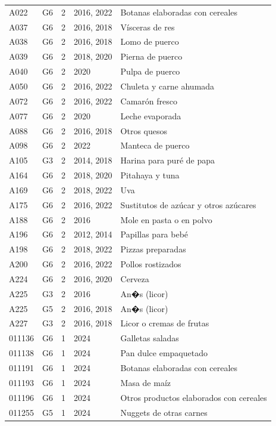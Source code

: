 \begin{table}[ht]
\begin{tabular}{llrll}
  A022 & G6 &   2 & 2016, 2022 & Botanas elaboradas con cereales \\ 
  A037 & G6 &   2 & 2016, 2018 & Vísceras de res \\ 
  A038 & G6 &   2 & 2016, 2018 & Lomo de puerco \\ 
  A039 & G6 &   2 & 2018, 2020 & Pierna de puerco \\ 
  A040 & G6 &   2 & 2020 & Pulpa de puerco \\ 
  A050 & G6 &   2 & 2016, 2022 & Chuleta y carne ahumada \\ 
  A072 & G6 &   2 & 2016, 2022 & Camarón fresco \\ 
  A077 & G6 &   2 & 2020 & Leche evaporada \\ 
  A088 & G6 &   2 & 2016, 2018 & Otros quesos \\ 
  A098 & G6 &   2 & 2022 & Manteca de puerco \\ 
  A105 & G3 &   2 & 2014, 2018 & Harina para puré de papa \\ 
  A164 & G6 &   2 & 2018, 2020 & Pitahaya y tuna \\ 
  A169 & G6 &   2 & 2018, 2022 & Uva \\ 
  A175 & G6 &   2 & 2016, 2022 & Sustitutos de azúcar y otros azúcares \\ 
  A188 & G6 &   2 & 2016 & Mole en pasta o en polvo \\ 
  A196 & G6 &   2 & 2012, 2014 & Papillas para bebé \\ 
  A198 & G6 &   2 & 2018, 2022 & Pizzas preparadas \\ 
  A200 & G6 &   2 & 2016, 2022 & Pollos rostizados \\ 
  A224 & G6 &   2 & 2016, 2020 & Cerveza \\ 
  A225 & G3 &   2 & 2016 & An�s (licor) \\ 
  A225 & G5 &   2 & 2016, 2018 & An�s (licor) \\ 
  A227 & G3 &   2 & 2016, 2018 & Licor o cremas de frutas \\ 
  011136 & G6 &   1 & 2024 & Galletas saladas \\ 
  011138 & G6 &   1 & 2024 & Pan dulce empaquetado \\ 
  011191 & G6 &   1 & 2024 & Botanas elaboradas con cereales \\ 
  011193 & G6 &   1 & 2024 & Masa de maíz \\ 
  011196 & G6 &   1 & 2024 & Otros productos elaborados con cereales \\ 
  011255 & G5 &   1 & 2024 & Nuggets de otras carnes \\ 

\end{tabular}
\end{table}
